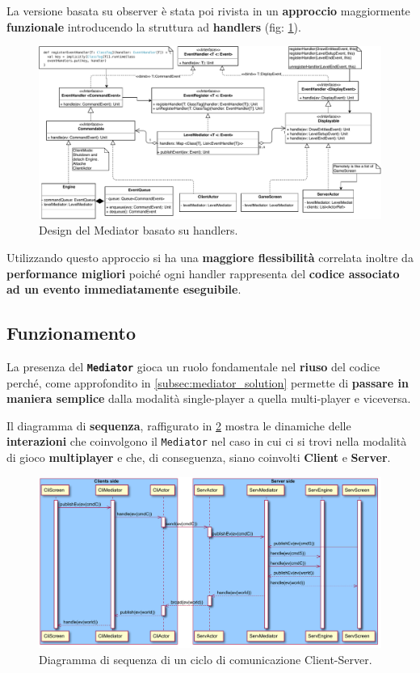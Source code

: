 La versione basata su observer è stata poi rivista in un \textbf{approccio} maggiormente \textbf{funzionale} introducendo la struttura ad \textbf{handlers} (fig: \ref{fig:mediatorHandler}).
\begin{figure}[H]
	\centering
	\includegraphics[width=0.99\columnwidth]{drawio/mediator/mediatorHandler.pdf}
	\caption{Design del Mediator basato su handlers.}
	\label{fig:mediatorHandler}
\end{figure}

Utilizzando questo approccio si ha una \textbf{maggiore flessibilità} correlata inoltre da \textbf{performance migliori} poiché ogni handler rappresenta del \textbf{codice associato ad un evento immediatamente eseguibile}.

\subsection{Funzionamento}

La presenza del \textbf{\texttt{Mediator}} gioca un ruolo fondamentale nel \textbf{riuso} del codice perché, come approfondito in \ref{subsec:mediator_solution} permette di \textbf{passare in maniera semplice} dalla modalità single-player a quella multi-player e viceversa.

Il diagramma di \textbf{sequenza}, raffigurato in \ref{fig:sequenceMediator} mostra le dinamiche delle \textbf{interazioni} che coinvolgono il \texttt{Mediator} nel caso in cui ci si trovi nella modalità di gioco \textbf{multiplayer} e che, di conseguenza, siano coinvolti \textbf{Client} e \textbf{Server}.

\begin{figure}[H]
	\centering
	\includegraphics[width=0.99\columnwidth]{plantuml/rendered/sequenceDiagrams/sequenceMediator.pdf}
	\caption{Diagramma di sequenza di un ciclo di comunicazione Client-Server.}
	\label{fig:sequenceMediator}
\end{figure}

